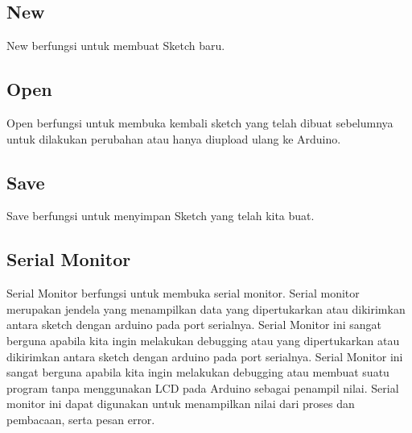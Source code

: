 \subsection{New}
New berfungsi untuk membuat Sketch baru.
\subsection{Open}
Open berfungsi untuk membuka kembali sketch yang telah dibuat sebelumnya untuk dilakukan perubahan atau hanya diupload ulang ke Arduino.
\subsection{Save}
Save berfungsi untuk menyimpan Sketch yang telah kita buat.
\subsection{Serial Monitor}
Serial Monitor berfungsi untuk membuka serial monitor. Serial monitor merupakan jendela yang menampilkan data yang dipertukarkan atau dikirimkan antara sketch dengan arduino pada port serialnya. Serial Monitor ini sangat berguna apabila kita ingin melakukan debugging atau yang dipertukarkan atau dikirimkan antara sketch dengan arduino pada port serialnya. Serial Monitor ini sangat berguna apabila kita ingin melakukan debugging atau membuat suatu program tanpa menggunakan LCD pada Arduino sebagai penampil nilai. Serial monitor ini dapat digunakan untuk menampilkan nilai dari proses dan pembacaan, serta pesan error.
